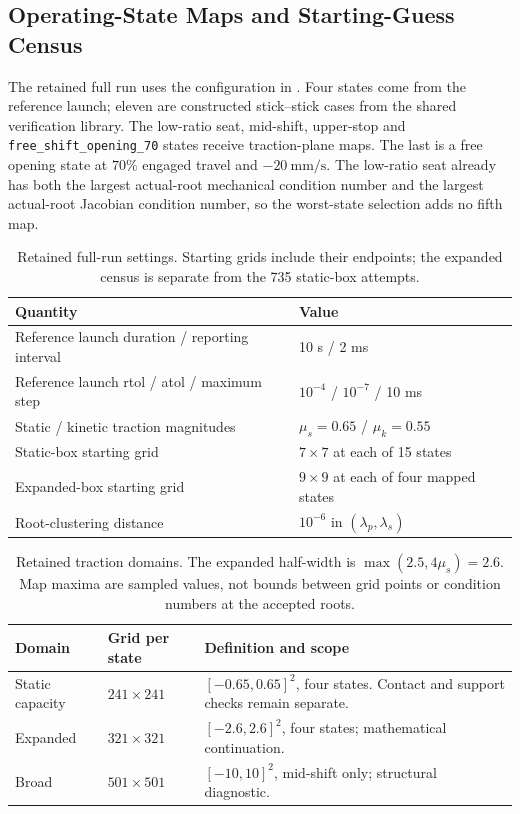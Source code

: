 \documentclass[11pt]{report}
\numberwithin{equation}{section}
\begin{document}
\subsection{Operating-State Maps and Starting-Guess Census}

The retained full run uses the configuration in
.
Four states come from the reference launch; eleven are constructed
stick--stick cases from the shared verification library. The low-ratio
seat, mid-shift, upper-stop and \texttt{free\_shift\_opening\_70} states
receive traction-plane maps. The last is a free opening state at \(70\%\)
engaged travel and \(-20~\mathrm{mm/s}\). The low-ratio seat already has
both the largest actual-root mechanical condition number and the largest
actual-root Jacobian condition number, so the worst-state selection adds
no fifth map.

\begin{table}[!htbp]
\centering\small
\begin{tabular}{@{}p{}p{}@{}}
\toprule
Quantity & Value \\ \midrule
Reference launch duration / reporting interval & 10 s / 2 ms \\
Reference launch rtol / atol / maximum step & $10^{-4}$ / $10^{-7}$ / 10 ms \\
Static / kinetic traction magnitudes & $\mu_s=0.65$ / $\mu_k=0.55$ \\
Static-box starting grid & $7\times7$ at each of 15 states \\
Expanded-box starting grid & $9\times9$ at each of four mapped states \\
Root-clustering distance & $10^{-6}$ in $(\lambda_p,\lambda_s)$ \\
\bottomrule
\end{tabular}
\caption{Retained full-run settings. Starting grids include their endpoints;
the expanded census is separate from the 735 static-box attempts.}
\label{tab:closure_study_settings}
\end{table}

\begin{table}[!htbp]
\centering\small
\begin{tabular}{@{}p{}p{}p{}@{}}
\toprule
Domain & Grid per state & Definition and scope \\ \midrule
Static capacity & $241\times241$ & $[-0.65,0.65]^2$, four states. Contact and support checks remain separate. \\
Expanded & $321\times321$ & $[-2.6,2.6]^2$, four states; mathematical continuation. \\
Broad & $501\times501$ & $[-10,10]^2$, mid-shift only; structural diagnostic. \\
\bottomrule
\end{tabular}
\caption{Retained traction domains. The expanded half-width is
$\max(2.5,4\mu_s)=2.6$. Map maxima are sampled values, not bounds between
grid points or condition numbers at the accepted roots.}
\label{tab:closure_lambda_domains}
\end{table}
\end{document}
